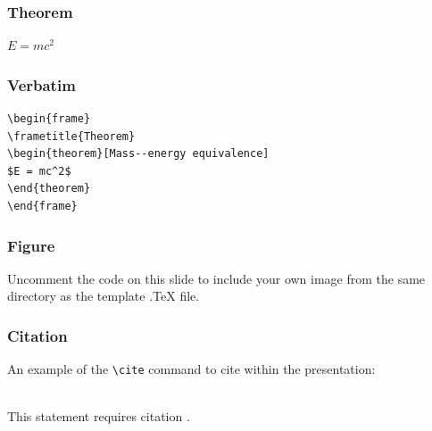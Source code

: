 \documentclass{beamer}
\begin{document}

\begin{frame}
\frametitle{Theorem}
\begin{theorem}
$E = mc^2$
\end{theorem}
\end{frame}


\begin{frame}[fragile] %
\frametitle{Verbatim}
\begin{example}
\begin{verbatim}
\begin{frame}
\frametitle{Theorem}
\begin{theorem}[Mass--energy equivalence]
$E = mc^2$
\end{theorem}
\end{frame}\end{verbatim}
\end{example}
\end{frame}


\begin{frame}
\frametitle{Figure}
Uncomment the code on this slide to include your own image from the same directory as the template .TeX file.
\end{frame}


\begin{frame}[fragile] %
\frametitle{Citation}
An example of the \verb|\cite| command to cite within the presentation:\\~

This statement requires citation \cite{p1}.
\end{frame}

\end{document}
